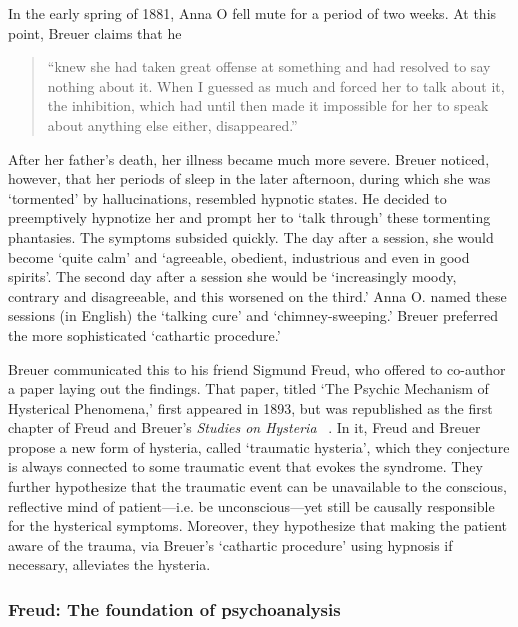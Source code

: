 \begin{refsection}
In the early spring of 1881, Anna O fell mute for a period of two weeks. At this point, Breuer claims that he 

\begin{quote}

``knew she had taken great offense at something and had resolved to say nothing about it. When I guessed as much and forced her to talk about it, the inhibition, which had until then made it impossible for her to speak about anything else either, disappeared.'' ~\citep[p 29]{Freud:kVwxqGOZ}
\end{quote}

After her father's death, her illness became much more severe. Breuer noticed, however, that her periods of sleep in the later afternoon, during which she was `tormented' by hallucinations, resembled hypnotic states. He decided to preemptively hypnotize her and prompt her to `talk through' these tormenting phantasies. The symptoms subsided quickly. The day after a session, she would become `quite calm' and `agreeable, obedient, industrious and even in good spirits'. The second day after a session she would be `increasingly moody, contrary and disagreeable, and this worsened on the third.' Anna O. named these sessions (in English) the `talking cure' and `chimney-sweeping.' Breuer preferred the more sophisticated `cathartic procedure.'

Breuer communicated this to his friend Sigmund Freud, who offered to co-author a paper laying out the findings. That paper, titled `The Psychic Mechanism of Hysterical Phenomena,' first appeared in 1893, but was republished as the first chapter of Freud and Breuer's \emph{Studies on Hysteria} ~\citep[1895]{Freud:kVwxqGOZ}. In it, Freud and Breuer propose a new form of hysteria, called `traumatic hysteria', which they conjecture is always connected to some traumatic event that evokes the syndrome. They further hypothesize that the traumatic event can be unavailable to the conscious, reflective mind of patient---i.e. be unconscious---yet still be causally responsible for the hysterical symptoms. Moreover, they hypothesize that making the patient aware of the trauma, via Breuer's `cathartic procedure' using hypnosis if necessary, alleviates the hysteria.

\subsubsection{Freud: The foundation of psychoanalysis}
\label{freud:thefoundationofpsychoanalysis}


\end{refsection}
